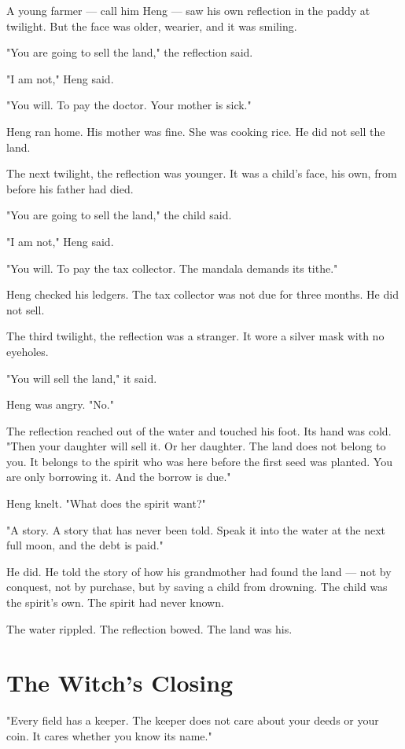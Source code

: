 \documentclass[10pt,twoside]{book}
\begin{document}
A young farmer --- call him Heng --- saw his own reflection in the paddy at twilight. But the face was older, wearier, and it was smiling.

"You are going to sell the land," the reflection said.

"I am not," Heng said.

"You will. To pay the doctor. Your mother is sick."

Heng ran home. His mother was fine. She was cooking rice. He did not sell the land.

The next twilight, the reflection was younger. It was a child's face, his own, from before his father had died.

"You are going to sell the land," the child said.

"I am not," Heng said.

"You will. To pay the tax collector. The mandala demands its tithe."

Heng checked his ledgers. The tax collector was not due for three months. He did not sell.

The third twilight, the reflection was a stranger. It wore a silver mask with no eyeholes.

"You will sell the land," it said.

Heng was angry. "No."

The reflection reached out of the water and touched his foot. Its hand was cold. "Then your daughter will sell it. Or her daughter. The land does not belong to you. It belongs to the spirit who was here before the first seed was planted. You are only borrowing it. And the borrow is due."

Heng knelt. "What does the spirit want?"

"A story. A story that has never been told. Speak it into the water at the next full moon, and the debt is paid."

He did. He told the story of how his grandmother had found the land --- not by conquest, not by purchase, but by saving a child from drowning. The child was the spirit's own. The spirit had never known.

The water rippled. The reflection bowed. The land was his.

\section*{The Witch's Closing}
"Every field has a keeper. The keeper does not care about your deeds or your coin. It cares whether you know its name."
\end{document}
